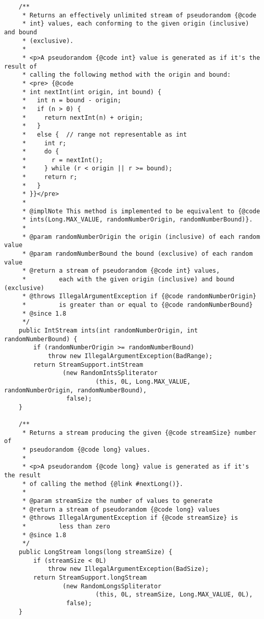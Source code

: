 \documentclass[12pt,a4paper,twoside,openright,titlepage,final]{article}
\begin{document}
\begin{verbatim}
    /**
     * Returns an effectively unlimited stream of pseudorandom {@code
     * int} values, each conforming to the given origin (inclusive) and bound
     * (exclusive).
     *
     * <p>A pseudorandom {@code int} value is generated as if it's the result of
     * calling the following method with the origin and bound:
     * <pre> {@code
     * int nextInt(int origin, int bound) {
     *   int n = bound - origin;
     *   if (n > 0) {
     *     return nextInt(n) + origin;
     *   }
     *   else {  // range not representable as int
     *     int r;
     *     do {
     *       r = nextInt();
     *     } while (r < origin || r >= bound);
     *     return r;
     *   }
     * }}</pre>
     *
     * @implNote This method is implemented to be equivalent to {@code
     * ints(Long.MAX_VALUE, randomNumberOrigin, randomNumberBound)}.
     *
     * @param randomNumberOrigin the origin (inclusive) of each random value
     * @param randomNumberBound the bound (exclusive) of each random value
     * @return a stream of pseudorandom {@code int} values,
     *         each with the given origin (inclusive) and bound (exclusive)
     * @throws IllegalArgumentException if {@code randomNumberOrigin}
     *         is greater than or equal to {@code randomNumberBound}
     * @since 1.8
     */
    public IntStream ints(int randomNumberOrigin, int randomNumberBound) {
        if (randomNumberOrigin >= randomNumberBound)
            throw new IllegalArgumentException(BadRange);
        return StreamSupport.intStream
                (new RandomIntsSpliterator
                         (this, 0L, Long.MAX_VALUE, randomNumberOrigin, randomNumberBound),
                 false);
    }

    /**
     * Returns a stream producing the given {@code streamSize} number of
     * pseudorandom {@code long} values.
     *
     * <p>A pseudorandom {@code long} value is generated as if it's the result
     * of calling the method {@link #nextLong()}.
     *
     * @param streamSize the number of values to generate
     * @return a stream of pseudorandom {@code long} values
     * @throws IllegalArgumentException if {@code streamSize} is
     *         less than zero
     * @since 1.8
     */
    public LongStream longs(long streamSize) {
        if (streamSize < 0L)
            throw new IllegalArgumentException(BadSize);
        return StreamSupport.longStream
                (new RandomLongsSpliterator
                         (this, 0L, streamSize, Long.MAX_VALUE, 0L),
                 false);
    }


\end{verbatim}
\end{document}
